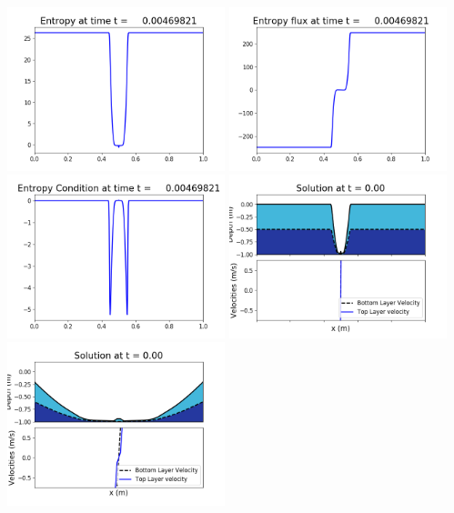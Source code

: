 \documentclass[11pt]{article}
\begin{document}
\vskip 10pt 
\includegraphics[width=0.475\textwidth]{frame0030fig1007.png}
\includegraphics[width=0.475\textwidth]{frame0030fig1008.png}
\vskip 10pt 
\includegraphics[width=0.475\textwidth]{frame0030fig1009.png}
\vskip 10pt 
\includegraphics[width=0.475\textwidth]{frame0031fig1001.png}
\includegraphics[width=0.475\textwidth]{frame0031fig1002.png}
\end{document}
